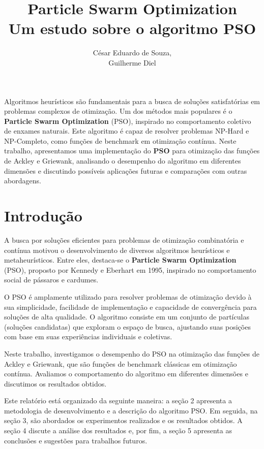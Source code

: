 \documentclass[12pt]{article}
\title{Particle Swarm Optimization\\ Um estudo sobre o algoritmo PSO}
\author{César Eduardo de Souza\inst{1},\\ Guilherme Diel\inst{1}}
\begin{document}
 

\maketitle

     
\begin{resumo} 
  Algoritmos heurísticos são fundamentais para a busca de soluções satisfatórias em problemas complexos de otimização. Um dos métodos mais populares é o \textbf{Particle Swarm Optimization} (PSO), inspirado no comportamento coletivo de enxames naturais. Este algoritmo é capaz de resolver problemas NP-Hard e NP-Completo, como funções de benchmark em otimização contínua. Neste trabalho, apresentamos uma implementação do \textbf{PSO} para otimização das funções de Ackley e Griewank, analisando o desempenho do algoritmo em diferentes dimensões e discutindo possíveis aplicações futuras e comparações com outras abordagens.
\end{resumo}


\section{Introdução}
\label{sec:introducao}
A busca por soluções eficientes para problemas de otimização combinatória e contínua motivou o desenvolvimento de diversos algoritmos heurísticos e metaheurísticos. Entre eles, destaca-se o \textbf{Particle Swarm Optimization} (PSO), proposto por Kennedy e Eberhart em 1995, inspirado no comportamento social de pássaros e cardumes.

O PSO é amplamente utilizado para resolver problemas de otimização devido à sua simplicidade, facilidade de implementação e capacidade de convergência para soluções de alta qualidade. O algoritmo consiste em um conjunto de partículas (soluções candidatas) que exploram o espaço de busca, ajustando suas posições com base em suas experiências individuais e coletivas.

Neste trabalho, investigamos o desempenho do PSO na otimização das funções de Ackley e Griewank, que são funções de benchmark clássicas em otimização contínua. Avaliamos o comportamento do algoritmo em diferentes dimensões e discutimos os resultados obtidos.

Este relatório está organizado da seguinte maneira: a seção 2 apresenta a metodologia de desenvolvimento e a descrição do algoritmo PSO. Em seguida, na seção 3, são abordados os experimentos realizados e os resultados obtidos. A seção 4 discute a análise dos resultados e, por fim, a seção 5 apresenta as conclusões e sugestões para trabalhos futuros.
\end{document}

